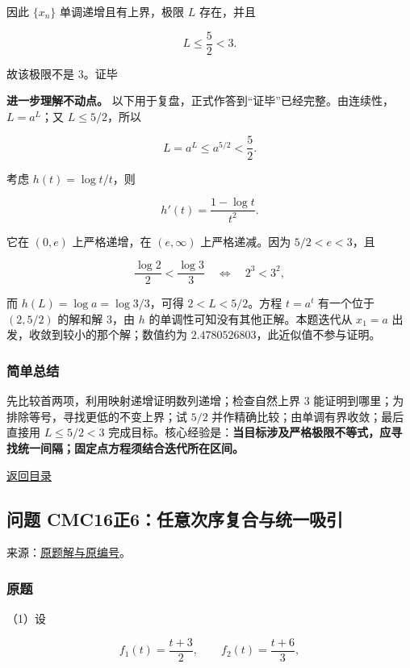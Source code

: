 \documentclass[11pt,a4paper]{article}
\begin{document}
因此 \(\{x_n\}\) 单调递增且有上界，极限 \(L\) 存在，并且

\[
\boxed{L\le\frac52<3}.
\]

故该极限不是 \(3\)。证毕

\textbf{进一步理解不动点。}
以下用于复盘，正式作答到``证毕''已经完整。由连续性，\(L=a^L\)；又
\(L\le5/2\)，所以

\[
L=a^L\le a^{5/2}<\frac52.
\]

考虑 \(h(t)=\log t/t\)，则

\[
h'(t)=\frac{1-\log t}{t^2}.
\]

它在 \((0,e)\) 上严格递增，在 \((e,\infty)\) 上严格递减。因为
\(5/2<e<3\)，且

\[
\frac{\log2}{2}<\frac{\log3}{3}
\quad\Longleftrightarrow\quad 2^3<3^2,
\]

而 \(h(L)=\log a=\log3/3\)，可得 \(2<L<5/2\)。方程 \(t=a^t\) 有一个位于
\((2,5/2)\) 的解和解 \(3\)，由 \(h\)
的单调性可知没有其他正解。本题迭代从 \(x_1=a\)
出发，收敛到较小的那个解；数值约为
\(2.4780526803\)，此近似值不参与证明。

\subsubsection{简单总结}\label{ux7b80ux5355ux603bux7ed3-20}

先比较首两项，利用映射递增证明数列递增；检查自然上界 \(3\)
能证明到哪里；为排除等号，寻找更低的不变上界；试 \(5/2\)
并作精确比较；由单调有界收敛；最后直接用 \(L\le5/2<3\)
完成目标。核心经验是：\textbf{当目标涉及严格极限不等式，应寻找统一间隔；固定点方程须结合迭代所在区间。}

\noindent\hyperref[contents]{返回目录}

\subsection{问题
CMC16正6：任意次序复合与统一吸引}\label{ux95eeux9898-cmc16ux6b636ux4efbux610fux6b21ux5e8fux590dux5408ux4e0eux7edfux4e00ux5438ux5f15}

来源：\href{https://zj139.github.io/math-notes/essays/bcc6708ecabf713a6483efa8/\#问题-6}{原题解与原编号}。

\subsubsection{原题}\label{ux539fux9898-21}

（1）设

\[
f_1(t)=\frac{t+3}{2},\qquad
f_2(t)=\frac{t+6}{3},
\]
\end{document}
